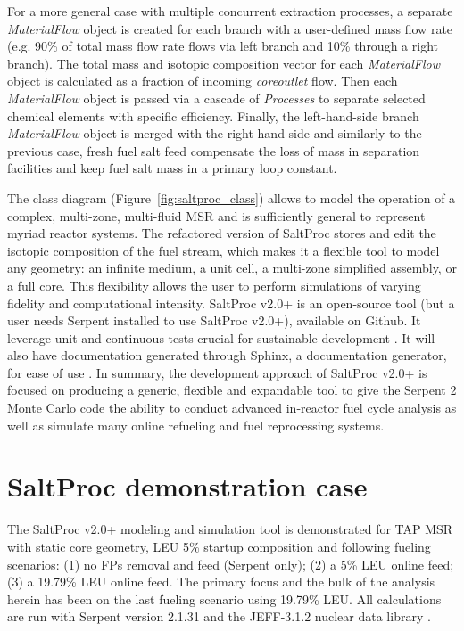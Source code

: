 \documentclass[12pt]{article} %
\begin{document}
For a more general case with multiple concurrent extraction processes, a separate 
\textit{MaterialFlow} object is created for each branch with a user-defined 
mass flow rate (e.g. 90\% of total mass flow rate flows via left branch and 
10\% through a right branch). The total mass and isotopic composition vector 
for each \textit{MaterialFlow} object is calculated as a fraction of incoming 
\textit{core\textunderscore outlet} flow. Then each \textit{MaterialFlow} object is 
passed via a cascade of \textit{Processes} to separate selected chemical elements with 
specific efficiency. Finally, the left-hand-side branch \textit{MaterialFlow} object is
 merged with the right-hand-side and similarly to the previous case, fresh 
fuel salt feed compensate the loss of mass in separation facilities and keep 
fuel salt mass in a primary loop constant.

The class diagram (Figure~\ref{fig:saltproc_class}) allows to model 
the operation of a complex, multi-zone, 
multi-fluid \gls{MSR} and is sufficiently general to represent myriad reactor 
systems. The refactored version of SaltProc stores and edit the 
isotopic composition of the fuel stream, which makes it a flexible tool to 
model any geometry: an infinite medium, a unit cell, a multi-zone simplified 
assembly, or a full core. This flexibility allows the user to perform 
simulations of varying fidelity and computational intensity. SaltProc v2.0+ is an 
open-source tool (but a user needs Serpent installed to use SaltProc v2.0+), 
available on Github. It leverage unit and continuous tests  
crucial for sustainable development \cite{krekel_pytest_2004}. It will also 
have documentation generated through Sphinx, a documentation generator, for ease 
of use \cite{brandl_sphinx_2009}. In summary, the 
development approach of SaltProc v2.0+ is focused on producing a generic, flexible and 
expandable tool to give the Serpent 2 Monte Carlo code the ability to conduct 
advanced in-reactor fuel cycle analysis as well as simulate many 
online refueling and fuel reprocessing systems.

\section{SaltProc demonstration case}
The SaltProc v2.0+ modeling and simulation tool is demonstrated
for \gls{TAP} \gls{MSR} with static core geometry, \gls{LEU} 5\% 
startup composition 
\cite{transatomic_power_corporation_neutronics_2016} and following 
fueling scenarios: (1) no \glspl{FP} removal and feed (Serpent only);
(2) a 5\% \gls{LEU} online feed; (3) a 19.79\% 
\gls{LEU} online feed. 
The primary focus and the bulk of the analysis 
herein has been on the last fueling scenario using 
19.79\% \gls{LEU}. All calculations are run with 
Serpent version 2.1.31 and the JEFF-3.1.2 nuclear data library 
\cite{leppanen_serpent_2013, oecd/nea_data_bank_jeff-3.1.2_2014}.
\end{document}
